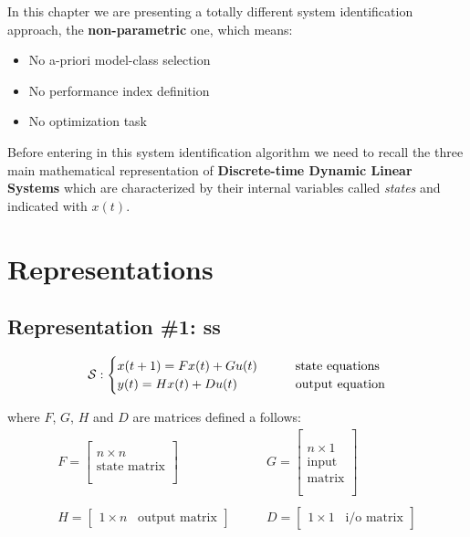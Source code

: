 In this chapter we are presenting a totally different system identification approach, the \textbf{non-parametric} one, which means:
\begin{itemize}
    \item No a-priori model-class selection
    \item No performance index definition
    \item No optimization task
\end{itemize}

Before entering in this system identification algorithm we need to recall the three main mathematical representation of \textbf{Discrete-time Dynamic Linear Systems} which are characterized by their internal variables called \emph{states} and indicated with $x(t)$.


\section{Representations}

\subsection{Representation \#1: \acrfull{ss}}

\[
\mathcal{S}: 
\begin{cases}
    x(t+1) = F x(t) + G u(t) & \qquad \text{state equations} \\
    y(t) = H x(t) + D u(t) & \qquad \text{output equation}
\end{cases}
\]

where $F$, $G$, $H$ and $D$ are matrices defined a follows:
\begin{align*}
    F = \begin{bmatrix}
        \\
        n \times n \\
        \text{state matrix} \\ \\
    \end{bmatrix}
    &
    \qquad
    G = \begin{bmatrix}
        \\
        \\
        n \times 1 \\
        \text{input} \\
        \text{matrix} \\ \\
    \end{bmatrix}
    \\ \\
    H = \begin{bmatrix}
        1 \times n \;\;\; \text{output matrix}
    \end{bmatrix}
    &
    \qquad
    D = \begin{bmatrix}
        1 \times 1 \;\;\; \text{i/o matrix}
    \end{bmatrix}
\end{align*}

